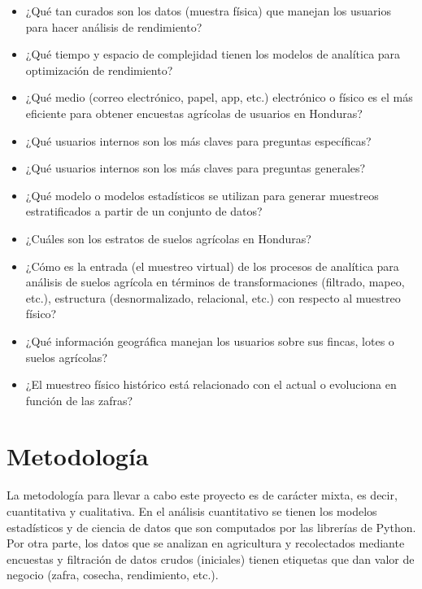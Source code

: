 \documentclass{report}
\begin{document}
\begin{itemize}
    \item ¿Qué tan curados son los datos (muestra física) que manejan los usuarios para hacer análisis de rendimiento?
    
    \item ¿Qué tiempo y espacio de complejidad tienen los modelos de analítica para optimización de rendimiento?
    
    \item ¿Qué medio (correo electrónico, papel, app, etc.) electrónico o físico es el más eficiente para obtener encuestas agrícolas de usuarios en Honduras?
    
    \item ¿Qué usuarios internos son los más claves para preguntas específicas?
    
    \item ¿Qué usuarios internos son los más claves para preguntas generales?
    
    \item ¿Qué modelo o modelos estadísticos se utilizan para generar muestreos estratificados a partir de un conjunto de datos?
    
    \item ¿Cuáles son los estratos de suelos agrícolas en Honduras?
    
    \item ¿Cómo es la entrada (el muestreo virtual) de los procesos de analítica para análisis de suelos agrícola en términos de transformaciones (filtrado, mapeo, etc.), estructura (desnormalizado, relacional, etc.) con respecto al muestreo físico?
    
    \item ¿Qué información geográfica manejan los usuarios sobre sus fincas, lotes o suelos agrícolas?
    
    \item ¿El muestreo físico histórico está relacionado con el actual o evoluciona en función de las zafras?
\end{itemize}


\section{Metodología}

La metodología para llevar a cabo este proyecto es de carácter mixta, es decir, cuantitativa y cualitativa. En el análisis cuantitativo se tienen los modelos estadísticos y de ciencia de datos que son computados por las librerías de Python. Por otra parte, los datos que se analizan en agricultura y recolectados mediante encuestas y filtración de datos crudos (iniciales) tienen etiquetas que dan valor de negocio (zafra, cosecha, rendimiento, etc.).
\end{document}
